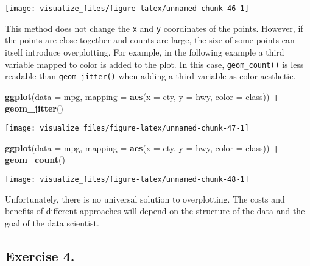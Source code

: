 \documentclass[]{book}
\newenvironment{Shaded}{\begin{snugshade}}{\end{snugshade}}
\newcommand{\DataTypeTok}[1]{\textcolor[rgb]{0.13,0.29,0.53}{#1}}
\newcommand{\KeywordTok}[1]{\textcolor[rgb]{0.13,0.29,0.53}{\textbf{#1}}}
\newcommand{\NormalTok}[1]{#1}
\newcommand{\OperatorTok}[1]{\textcolor[rgb]{0.81,0.36,0.00}{\textbf{#1}}}
\newcommand{\StringTok}[1]{\textcolor[rgb]{0.31,0.60,0.02}{#1}}
\theoremstyle{plain}
\theoremstyle{remark}
\theoremstyle{definition}
\theoremstyle{definition}
\theoremstyle{definition}
\theoremstyle{remark}
\begin{document}
\begin{center}\texttt{[image: visualize\_files/figure-latex/unnamed-chunk-46-1]} \end{center}

This method does not change the \texttt{x} and \texttt{y} coordinates of
the points. However, if the points are close together and counts are
large, the size of some points can itself introduce overplotting. For
example, in the following example a third variable mapped to color is
added to the plot. In this case, \texttt{geom\_count()} is less readable
than \texttt{geom\_jitter()} when adding a third variable as color
aesthetic.

\begin{Shaded}
\begin{Highlighting}[]
\KeywordTok{ggplot}\NormalTok{(}\DataTypeTok{data =}\NormalTok{ mpg, }\DataTypeTok{mapping =} \KeywordTok{aes}\NormalTok{(}\DataTypeTok{x =}\NormalTok{ cty, }\DataTypeTok{y =}\NormalTok{ hwy, }\DataTypeTok{color =}\NormalTok{ class)) }\OperatorTok{+}
\StringTok{  }\KeywordTok{geom_jitter}\NormalTok{()}
\end{Highlighting}
\end{Shaded}

\begin{center}\texttt{[image: visualize\_files/figure-latex/unnamed-chunk-47-1]} \end{center}

\begin{Shaded}
\begin{Highlighting}[]
\KeywordTok{ggplot}\NormalTok{(}\DataTypeTok{data =}\NormalTok{ mpg, }\DataTypeTok{mapping =} \KeywordTok{aes}\NormalTok{(}\DataTypeTok{x =}\NormalTok{ cty, }\DataTypeTok{y =}\NormalTok{ hwy, }\DataTypeTok{color =}\NormalTok{ class)) }\OperatorTok{+}
\StringTok{  }\KeywordTok{geom_count}\NormalTok{()}
\end{Highlighting}
\end{Shaded}

\begin{center}\texttt{[image: visualize\_files/figure-latex/unnamed-chunk-48-1]} \end{center}

Unfortunately, there is no universal solution to overplotting. The costs
and benefits of different approaches will depend on the structure of the
data and the goal of the data scientist.

\hypertarget{exercise-4.-2}{%
\subsection{Exercise 4.}\label{exercise-4.-2}}
\end{document}
